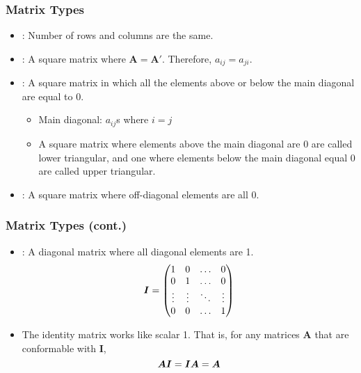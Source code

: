 \documentclass[pdflatex, 12pt]{beamer}
\begin{document}
\begin{frame}
\frametitle{Matrix Types}
\begin{itemize}
\item {\color{red}{Square Matrix}}: Number of rows and columns are the same. 
\vspace{0.4cm}
\item {\color{red}{Symmetric Matrix}}: A square matrix where $\bm{A} = \bm{A'}$. Therefore, $a_{ij} = a_{ji}$.
\vspace{0.4cm}
\item {\color{red}{Triangular Matrix}}: A square matrix in which all the elements above or below the main diagonal are equal to 0.
 \begin{itemize}
 \item Main diagonal: $a_{ij}$s where $i = j$
 \item A square matrix where elements above the main diagonal are 0 are called {\color{red}lower triangular}, and one where elements below the main diagonal equal 0 are called {\color{red} upper triangular}.
 \end{itemize}
\vspace{0.4cm}
\item {\color{red}{Diagonal Matrix}}: A square matrix where off-diagonal elements are all 0.
\end{itemize}
\end{frame}

\begin{frame}
\frametitle{Matrix Types (cont.)}
\begin{itemize}
\item {\color{red}{Identity Matrix}}: A diagonal matrix where all diagonal elements are 1.
 \begin{equation}
 \bm{I} = \begin{pmatrix}
 1 & 0 & \ldots & 0 \\
 0 & 1 & \ldots & 0 \\
 \vdots & \vdots & \ddots & \vdots \\
 0 & 0 & \ldots & 1 \\
 \end{pmatrix} \notag
 \end{equation}
\item The identity matrix works like scalar 1. That is, for any matrices $\bm{A}$ that are conformable with $\bm{I}$, 
 \begin{equation}
 \bm{AI} = \bm{IA} = \bm{A} \notag
 \end{equation}
\end{itemize}
\end{frame}
\end{document}
